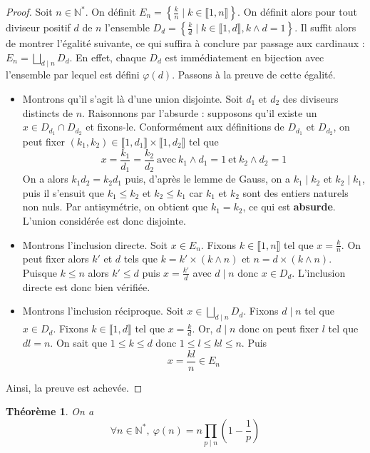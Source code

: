 \documentclass[french]{book}
\newcommand{\N}{\mathbb{N}}
\theoremstyle{plain}
\newtheorem{thm}{Théorème}[chapter]
\theoremstyle{definition}
\theoremstyle{remark}
\begin{document}
\begin{proof}
	Soit $n \in\N^*$. On définit $\displaystyle E_n= \left\{ \frac{k}{n} \mid k \in \llbracket 1,n\rrbracket\right\}$. On définit alors pour tout diviseur positif $d$ de $n$ l'ensemble $\displaystyle D_d= \left\{ \frac{k}{d} \mid k \in \llbracket 1,d\rrbracket, k \wedge d =1 \right\}$. Il suffit alors de montrer l'égalité suivante, ce qui suffira à conclure par passage aux cardinaux : $\displaystyle E_n = \bigsqcup_{d \mid n} D_d$.	En effet, chaque $D_d$ est immédiatement en bijection avec l'ensemble par lequel est défini $\varphi(d)$. Passons à la preuve de cette égalité.
	\begin{itemize}
		\item Montrons qu'il s'agit là d'une union disjointe. Soit $d_1$ et $d_2$
		des diviseurs distincts de $n$. Raisonnons par l'absurde : supposons qu'il
		existe un $x \in D_{d_1} \cap D_{d_2}$ et fixons-le. Conformément aux
		définitions de $D_{d_1}$ et $D_{d_2}$, on peut fixer $\left( k_1, k_2
		\right) \in \llbracket 1,d_1\rrbracket \times \llbracket 1,d_2\rrbracket$
		tel que	$$x=\frac{k_1}{d_1}=\frac{k_2}{d_2} \ \text{avec} \  k_1 \wedge d_1=1 \ \text{et} \ k_2 \wedge d_2=1$$
		On a alors $k_1 d_2 = k_2 d_1$ puis, d'après le lemme de Gauss, on a $k_1
		\mid k_2$ et $k_2 \mid k_1$, puis il s'ensuit que $k_1 \le k_2$ et $k_2
		\le k_1$ car $k_1$ et $k_2$ sont des entiers naturels non nuls. Par
		antisymétrie, on obtient que $k_1=k_2$, ce qui est \textbf{absurde}. L'union
		considérée est donc disjointe.
		
		\item Montrons l'inclusion directe. Soit $x \in E_n$. Fixons $k \in
		\llbracket 1, n \rrbracket$ tel que $x= \displaystyle\frac{k}{n}$. On peut
		fixer alors $k'$ et $d$ tels que $k= k' \times (k \wedge n)$ et $n= d
		\times (k \wedge n)$. Puisque $k \le n$ alors $k' \le d$ puis $x =
		\displaystyle\frac{k'}{d}$ avec $d \mid n$ donc $x \in D_d$. L'inclusion
		directe est donc bien vérifiée.
		
		\item Montrons l'inclusion réciproque. Soit $x \in \displaystyle\bigsqcup_{d
			\mid n} D_d$. Fixons $d \mid n$ tel que $x \in D_d$. Fixons $k \in
		\llbracket 1,d \rrbracket$ tel que $x= \displaystyle\frac{k}{d}$. Or, $d
		\mid n$ donc on peut fixer $l$ tel que $dl=n$. On sait que $1 \le k \le d$
		donc $1 \le l \le kl \le n$. Puis $$x= \frac{kl}{n} \in E_n$$
	\end{itemize}
	Ainsi, la preuve est achevée.
\end{proof}
\begin{thm}
	On a $$\forall n \in\N^*, \ \varphi(n) = n\prod_{p\mid n} \left(1-\frac{1}{p}\right)$$
\end{thm}
\end{document}
